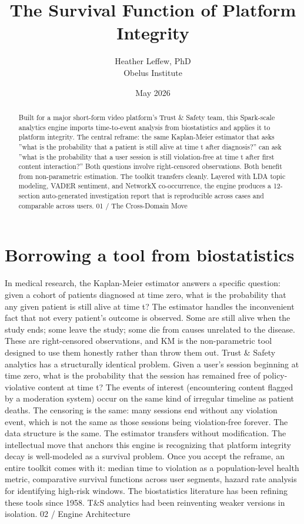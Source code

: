 \documentclass{obelus-preprint}
\title{The Survival Function of Platform Integrity}
\author{Heather Leffew, PhD\\Obelus Institute}
\date{May 2026}
\begin{document}
\maketitle

\begin{abstract}
Built for a major short-form video platform's Trust \& Safety team, this Spark-scale analytics engine imports time-to-event analysis from biostatistics and applies it to platform integrity. The central reframe: the same Kaplan-Meier estimator that asks ''what is the probability that a patient is still alive at time t after diagnosis?'' can ask ''what is the probability that a user session is still violation-free at time t after first content interaction?'' Both questions involve right-censored observations. Both benefit from non-parametric estimation. The toolkit transfers cleanly. Layered with LDA topic modeling, VADER sentiment, and NetworkX co-occurrence, the engine produces a 12-section auto-generated investigation report that is reproducible across cases and comparable across users.
01 / The Cross-Domain Move
\end{abstract}
\section{Borrowing a tool from biostatistics}
In medical research, the Kaplan-Meier estimator answers a specific question: given a cohort of patients diagnosed at time zero, what is the probability that any given patient is still alive at time t? The estimator handles the inconvenient fact that not every patient's outcome is observed. Some are still alive when the study ends; some leave the study; some die from causes unrelated to the disease. These are right-censored observations, and KM is the non-parametric tool designed to use them honestly rather than throw them out.
Trust \& Safety analytics has a structurally identical problem. Given a user's session beginning at time zero, what is the probability that the session has remained free of policy-violative content at time t? The events of interest (encountering content flagged by a moderation system) occur on the same kind of irregular timeline as patient deaths. The censoring is the same: many sessions end without any violation event, which is not the same as those sessions being violation-free forever. The data structure is the same. The estimator transfers without modification.
The intellectual move that anchors this engine is recognizing that platform integrity decay is well-modeled as a survival problem. Once you accept the reframe, an entire toolkit comes with it: median time to violation as a population-level health metric, comparative survival functions across user segments, hazard rate analysis for identifying high-risk windows. The biostatistics literature has been refining these tools since 1958. T\&S analytics had been reinventing weaker versions in isolation.
02 / Engine Architecture
\end{document}

